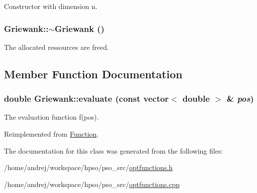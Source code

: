Constructor with dimension n. 

\hypertarget{classGriewank_f635212f9d2c41fe20b00c474e461743}{
\subsubsection{\setlength{\rightskip}{0pt plus 5cm}Griewank::$\sim$Griewank ()}}
\label{classGriewank_f635212f9d2c41fe20b00c474e461743}


The allocated ressources are freed. 



\subsection{Member Function Documentation}
\hypertarget{classGriewank_05917918e68b34e9ed3e794388975f6c}{
\subsubsection{\setlength{\rightskip}{0pt plus 5cm}double Griewank::evaluate (const vector$<$ double $>$ \& {\em pos})}}
\label{classGriewank_05917918e68b34e9ed3e794388975f6c}


The evaluation function f(pos). 



Reimplemented from \hyperlink{classFunction_159260a1fc3afa8932491e4057b6b844}{Function}.

The documentation for this class was generated from the following files:\begin{CompactItemize}
\item 
/home/andrej/workspace/hpso/pso\_\-src/\hyperlink{optfunctions_8h}{optfunctions.h}\item 
/home/andrej/workspace/hpso/pso\_\-src/\hyperlink{optfunctions_8cpp}{optfunctions.cpp}\end{CompactItemize}
